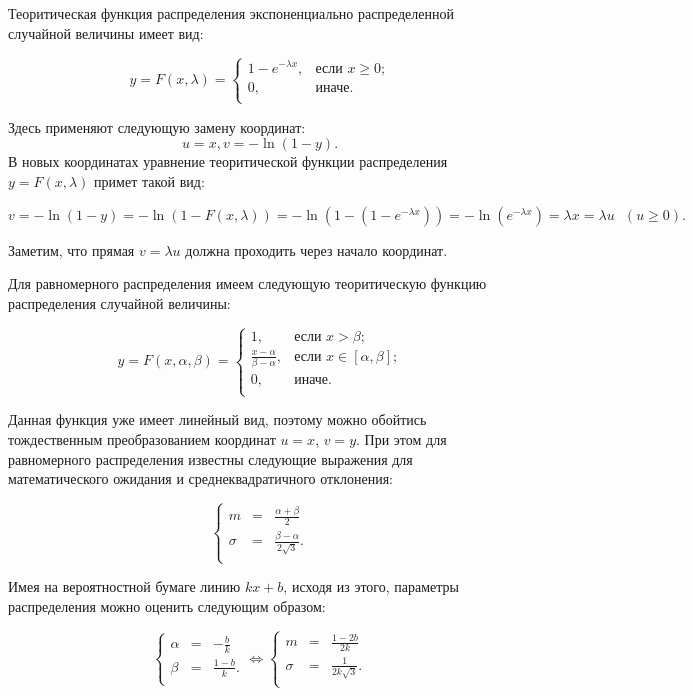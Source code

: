Теоритическая функция распределения экспоненциально распределенной случайной величины имеет вид:

$$
y = F(x, \lambda) =\begin{cases}
1 - e^{- \lambda x},&\text{если $x \geq 0$;}\\
0,&\text{иначе.}\\
\end{cases}
$$

Здесь применяют следующую замену координат: 
$$  
	u = x{,} v = -\ln(1-y).
$$
В новых координатах уравнение теоритической функции распределения $ y = F(x,\lambda) $ примет такой вид:


$$
	v = -\ln(1-y) = -\ln(1-F(x,\lambda)) = -\ln(1-(1-e^{- \lambda x})) = -\ln(e^{- \lambda x}) = \lambda x = \lambda u \text{ } (u \geq 0).
$$

Заметим, что прямая $ v = \lambda u $ должна проходить через начало координат.

Для равномерного распределения имеем следующую теоритическую функцию 
распределения случайной величины:

$$
y = F(x,\alpha,\beta) = \begin{cases}
1,&\text{если $x > \beta$;}\\
\frac{x-\alpha}{\beta-\alpha},&\text{если $x \in [\alpha,\beta]$;}\\
0,&\text{иначе.}\\
\end{cases}
$$

Данная функция уже имеет линейный вид, поэтому можно обойтись тождественным 
преобразованием координат $u = x$, $v = y$. При этом для равномерного 
распределения известны следующие выражения для математического ожидания 
и среднеквадратичного отклонения:

$$
\left\{
\begin{array}{rcl}
m&=&\frac{\alpha+\beta}{2}\\
\sigma&=&\frac{\beta-\alpha}{2\sqrt{3}}.\\
\end{array}
\right.
$$

Имея на вероятностной бумаге линию $kx+b$, исходя из этого, параметры 
распределения можно оценить следующим образом:

$$
\left\{
\begin{array}{rcl}
\alpha&=&-\frac{b}{k}\\
\beta&=&\frac{1-b}{k}.\\
\end{array}
\right.
\Longleftrightarrow
\left\{
\begin{array}{rcl}
m&=&\frac{1-2b}{2k}\\
\sigma&=&\frac{1}{2k\sqrt{3}}.\\
\end{array}
\right.
$$

